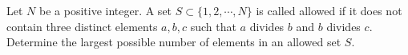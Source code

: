 Let $ N $ be a positive integer. A set $ S \subset \{ 1, 2, \cdots, N \} $ is called allowed if it does not contain three distinct elements $ a, b, c $ such that $ a $ divides $ b $ and $ b $ divides $c$. Determine the largest possible number of elements in an allowed set $ S $.